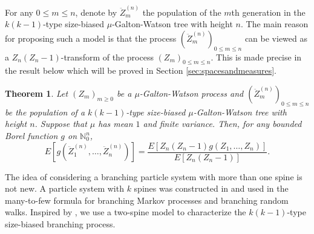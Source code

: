 \documentclass[UTF8]{pkuthss}
\theoremstyle{plain}
\newtheorem{thm}{Theorem}[section]
\theoremstyle{definition}
\numberwithin{equation}{section}
\begin{document}
For any $0\le m \le n$, denote by $\ddot Z_m^{(n)}$ the population of the $m$th generation in the $k(k-1)$-type size-biased $\mu$-Galton-Watson tree with height $n$.
The main reason for proposing such a model is that the process $(\ddot Z_m^{(n)})_{0\le m\le n}$ can be viewed as
a $Z_n(Z_n-1)$-transform of the process $(Z_m)_{0\le m\le n}$.
This is made precise in the result below which will be proved in Section \ref{sec:spacesandmeasures}.
\begin{thm}
	\label{thm: change of measure}
	Let $(Z_m)_{m\ge 0}$ be a $\mu$-Galton-Watson process and $(\ddot Z_m^{(n)})_{0\le m\le n}$ be the population of a $k(k-1)$-type size-biased $\mu$-Galton-Watson tree with height $n$.
	Suppose that $\mu$ has mean $1$ and finite variance.
	Then, for any bounded Borel function $g$ on $\mathbb N^{n}_0$,
	\[
	E[ g ( \ddot Z_1^{(n)}, \dots, \ddot Z_n^{(n)})]
	=
	\frac{ E[ Z_n(Z_n-1) g( Z_1, \dots, Z_n)]} {E [ Z_n ( Z_n - 1)]}.		
	\]
\end{thm}

The idea of considering a branching particle system with more than one spine is not new.
A particle system with $k$ spines  was constructed in \cite{HarrisRoberts2017Manytofew} and used in the  many-to-few formula for branching Markov processes and branching random walks.
Inspired by \cite{HarrisRoberts2017Manytofew}, we use a two-spine model to characterize the $k(k-1)$-type size-biased branching process.
\end{document}
